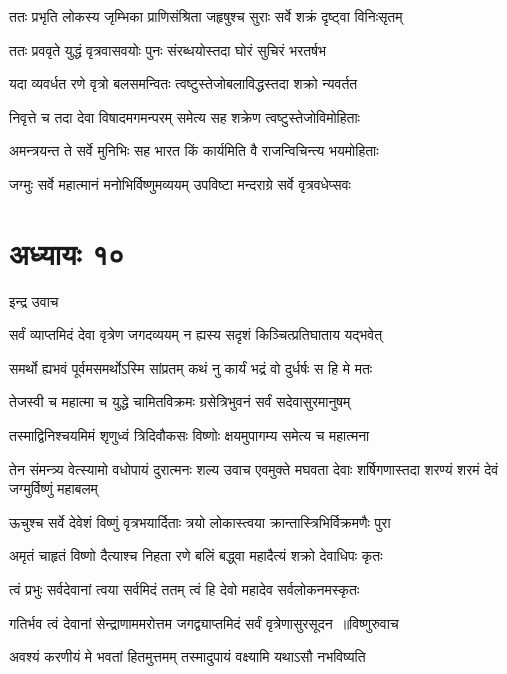 \twolineshloka
{ततः प्रभृति लोकस्य जृम्भिका प्राणिसंश्रिता}
{जहृषुश्च सुराः सर्वे शक्रं दृष्ट्वा विनिःसृतम्}


\twolineshloka
{ततः प्रववृते युद्धं वृत्रवासवयोः पुनः}
{संरब्धयोस्तदा घोरं सुचिरं भरतर्षभ}


\threelineshloka
{यदा व्यवर्धत रणे वृत्रो बलसमन्वितः}
{त्वष्टुस्तेजोबलाविद्धस्तदा शक्रो न्यवर्तत}
{}


\twolineshloka
{निवृत्ते च तदा देवा विषादमगमन्परम्}
{समेत्य सह शक्रेण त्वष्टुस्तेजोविमोहिताः}


\twolineshloka
{अमन्त्रयन्त ते सर्वे मुनिभिः सह भारत}
{किं कार्यमिति वै राजन्विचिन्त्य भयमोहिताः}


\twolineshloka
{जग्मुः सर्वे महात्मानं मनोभिर्विष्णुमव्ययम्}
{उपविष्टा मन्दराग्रे सर्वे वृत्रवधेप्सवः}


\chapter{अध्यायः १०}
\twolineshloka
{इन्द्र उवाच}
{}


\twolineshloka
{सर्वं व्याप्तमिदं देवा वृत्रेण जगदव्ययम्}
{न ह्यस्य सदृशं किञ्चित्प्रतिघाताय यद्भवेत्}


\twolineshloka
{समर्थो ह्यभवं पूर्वमसमर्थोऽस्मि सांप्रतम्}
{कथं नु कार्यं भद्रं वो दुर्धर्षः स हि मे मतः}


\twolineshloka
{तेजस्वी च महात्मा च युद्धे चामितविक्रमः}
{ग्रसेत्रिभुवनं सर्वं सदेवासुरमानुषम्}


\twolineshloka
{तस्माद्विनिश्चयमिमं शृणुध्वं त्रिदिवौकसः}
{विष्णोः क्षयमुपागम्य समेत्य च महात्मना}


\fourlineindentedshloka
{तेन संमन्त्र्य वेत्स्यामो वधोपायं दुरात्मनः}
{शल्य उवाच}
{एवमुक्ते मघवता देवाः शर्षिगणास्तदा}
{शरण्यं शरमं देवं जग्मुर्विष्णुं महाबलम्}


\twolineshloka
{ऊचुश्च सर्वे देवेशं विष्णुं वृत्रभयार्दिताः}
{त्रयो लोकास्त्वया क्रान्तास्त्रिभिर्विक्रमणैः पुरा}


\twolineshloka
{अमृतं चाहृतं विष्णो दैत्याश्च निहता रणे}
{बलिं बद्ध्वा महादैत्यं शक्रो देवाधिपः कृतः}


\twolineshloka
{त्वं प्रभुः सर्वदेवानां त्वया सर्वमिदं ततम्}
{त्वं हि देवो महादेव सर्वलोकनमस्कृतः}


\threelineshloka
{गतिर्भव त्वं देवानां सेन्द्राणाममरोत्तम}
{जगद्व्याप्तमिदं सर्वं वृत्रेणासुरसूदन ॥विष्णुरुवाच}
{}


\twolineshloka
{अवश्यं करणीयं मे भवतां हितमुत्तमम्}
{तस्मादुपायं वक्ष्यामि यथाऽसौ नभविष्यति}


